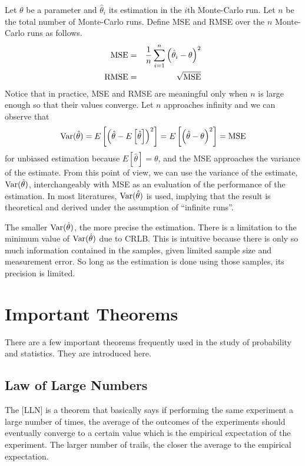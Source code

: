 Let $\theta$ be a parameter and $\hat{\theta}_i$ its estimation in the $i$th Monte-Carlo run. Let $n$ be the total number of Monte-Carlo runs. Define MSE and RMSE over the $n$ Monte-Carlo runs as follows.
\begin{eqnarray}
	\textup{MSE} &=& \dfrac{1}{n}\sum_{i=1}^{n}\left(\hat{\theta}_i-\theta\right)^2 \nonumber \\
	\textup{RMSE} &=& \sqrt{\textup{MSE}} \nonumber
\end{eqnarray}
Notice that in practice, MSE and RMSE are meaningful only when $n$ is large enough so that their values converge. Let $n$ approaches infinity and we can observe that
\begin{eqnarray}
	\textup{Var}(\hat{\theta}) = E\left[\left(\hat{\theta}-E\left[\hat{\theta}\right]\right)^2\right] = E\left[\left(\hat{\theta}-\theta\right)^2\right] = \textup{MSE} \nonumber
\end{eqnarray}
for unbiased estimation because $E\left[\hat{\theta}\right]=\theta$, and the MSE approaches the variance of the estimate. From this point of view, we can use the variance of the estimate, $\textup{Var}(\hat{\theta})$, interchangeably with MSE as an evaluation of the performance of the estimation. In most literatures, $\textup{Var}(\hat{\theta})$ is used, implying that the result is theoretical and derived under the assumption of ``infinite runs''.

The smaller $\textup{Var}(\hat{\theta})$, the more precise the estimation. There is a limitation to the minimum value of $\textup{Var}(\hat{\theta})$ due to CRLB. This is intuitive because there is only so much information contained in the samples, given limited sample size and measurement error. So long as the estimation is done using those samples, its precision is limited. 

\section{Important Theorems}

There are a few important theorems frequently used in the study of probability and statistics. They are introduced here.

\subsection{Law of Large Numbers} \label{subsec:largenumbers}

The [LLN] is a theorem that basically says if performing the same experiment a large number of times, the average of the outcomes of the experiments should eventually converge to a certain value which is the empirical expectation of the experiment. The larger number of trails, the closer the average to the empirical expectation.


